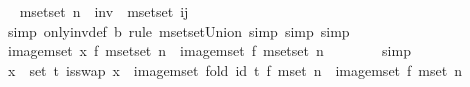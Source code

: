 \begin{isabellebody}
\ \isamarkupfalse%
\ {\isachardoublequoteopen}mset{\isacharunderscore}{\kern0pt}set\ {\isacharbraceleft}{\kern0pt}{}{\isachardot}{\kern0pt}{\isachardot}{\kern0pt}{\isacharless}{\kern0pt}n{\isacharbraceright}{\kern0pt}\ {\isacharequal}{\kern0pt}\ inv\ {\isacharplus}{\kern0pt}\ mset{\isacharunderscore}{\kern0pt}set\ {\isacharbraceleft}{\kern0pt}i{\isacharcomma}{\kern0pt}j{\isacharbraceright}{\kern0pt}{\isachardoublequoteclose}\isanewline
\ \ \ \ \ \ \isamarkupfalse%
\ {\isacharparenleft}{\kern0pt}simp\ only{\isacharcolon}{\kern0pt}inv{\isacharunderscore}{\kern0pt}def\ b{\isacharcomma}{\kern0pt}\ rule\ mset{\isacharunderscore}{\kern0pt}set{\isacharunderscore}{\kern0pt}Union{\isacharcomma}{\kern0pt}\ simp{\isacharcomma}{\kern0pt}\ simp{\isacharcomma}{\kern0pt}\ simp{\isacharparenright}{\kern0pt}\ \isanewline
\ \ \ \ \isamarkupfalse%
\ \isamarkupfalse%
\ {\isachardoublequoteopen}image{\isacharunderscore}{\kern0pt}mset\ {\isacharparenleft}{\kern0pt}x\ f{\isacharparenright}{\kern0pt}\ {\isacharparenleft}{\kern0pt}mset{\isacharunderscore}{\kern0pt}set\ {\isacharbraceleft}{\kern0pt}{}{\isachardot}{\kern0pt}{\isachardot}{\kern0pt}{\isacharless}{\kern0pt}n{\isacharbraceright}{\kern0pt}{\isacharparenright}{\kern0pt}\ {\isacharequal}{\kern0pt}\ image{\isacharunderscore}{\kern0pt}mset\ f\ {\isacharparenleft}{\kern0pt}mset{\isacharunderscore}{\kern0pt}set\ {\isacharbraceleft}{\kern0pt}{}{\isachardot}{\kern0pt}{\isachardot}{\kern0pt}{\isacharless}{\kern0pt}n{\isacharbraceright}{\kern0pt}{\isacharparenright}{\kern0pt}{\isachardoublequoteclose}\isanewline
\ \ \ \ \ \ \isamarkupfalse%
\ simp\isanewline
\ \ \isamarkupfalse%
\isanewline
\isanewline
\ \ \isamarkupfalse%
\ {\isachardoublequoteopen}{\isacharparenleft}{\kern0pt}{\isasymforall}x\ {\isasymin}\ set\ t{\isachardot}{\kern0pt}\ is{\isacharunderscore}{\kern0pt}swap\ x{\isacharparenright}{\kern0pt}\ {\isasymLongrightarrow}\ image{\isacharunderscore}{\kern0pt}mset\ {\isacharparenleft}{\kern0pt}fold\ id\ t\ f{\isacharparenright}{\kern0pt}\ {\isacharparenleft}{\kern0pt}mset\ {\isacharbrackleft}{\kern0pt}{}{\isachardot}{\kern0pt}{\isachardot}{\kern0pt}{\isacharless}{\kern0pt}n{\isacharbrackright}{\kern0pt}{\isacharparenright}{\kern0pt}\ {\isacharequal}{\kern0pt}\ image{\isacharunderscore}{\kern0pt}mset\ f\ {\isacharparenleft}{\kern0pt}mset\ {\isacharbrackleft}{\kern0pt}{}{\isachardot}{\kern0pt}{\isachardot}{\kern0pt}{\isacharless}{\kern0pt}n{\isacharbrackright}{\kern0pt}{\isacharparenright}{\kern0pt}{\isachardoublequoteclose}\isanewline

\end{isabellebody}
